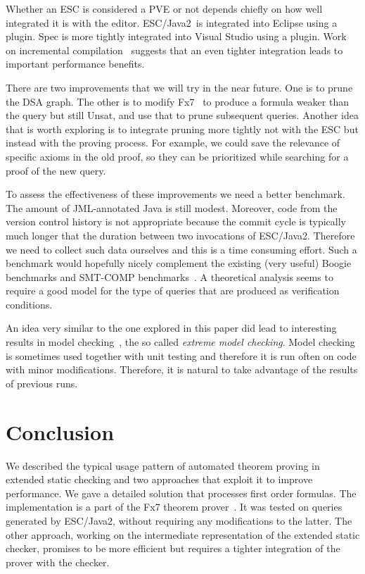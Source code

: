 \documentclass{llncs}
\def\unsat{{\sc Unsat}}
\def\escjava{\hskip 0pt\hbox{ESC/Java2}}
\begin{document}
Whether an ESC is considered a PVE or not depends chiefly
on how well integrated it is with the editor. \escjava\
is integrated into Eclipse using a plugin. Spec is
more tightly integrated into Visual Studio using a plugin.
Work on incremental compilation~\cite{schwartz1984icm}
suggests that an even tighter integration leads to important
performance benefits.

There are two improvements that we will try in the near 
future. One is to prune the DSA graph. The other is
to modify Fx7~\cite{fx7} to produce a formula weaker
than the query but still \unsat, and use that to prune
subsequent queries. Another idea that is worth exploring
is to integrate pruning more tightly not with the ESC but 
instead with the proving process. For example, we could
save the relevance of specific axioms in the old proof,
so they can be prioritized while searching for a proof 
of the new query.

To assess the effectiveness of these improvements we need
a better benchmark. The amount of JML-annotated
Java is still modest. Moreover, code from the version 
control history is not appropriate because the commit 
cycle is typically much longer that the duration between 
two invocations of \escjava. Therefore we need to collect 
such data ourselves and this is a time consuming effort. 
Such a benchmark would hopefully nicely complement the 
existing (very useful) Boogie benchmarks and SMT-COMP 
benchmarks~\cite{smtlib}. A theoretical analysis seems
to require a good model for the type of queries that
are produced as verification conditions.

An idea very similar to the one explored in this paper did
lead to interesting results in model checking~\cite{henzinger2004emc},
the so called \emph{extreme model checking}. Model checking
is sometimes used together with unit testing and therefore
it is run often on code with minor modifications.
Therefore, it is natural to take advantage of the results
of previous runs.

\section{Conclusion}

We described the typical usage pattern of automated theorem
proving in extended static checking and two approaches that
exploit it to improve performance. We gave a detailed solution 
that processes first order formulas. The implementation
is a part of the Fx7 theorem prover~\cite{fx7}. It was tested
on queries generated by \escjava, without requiring any
modifications to the latter. The other approach, working on
the intermediate representation of the extended static checker,
promises to be more efficient but requires a tighter integration
of the prover with the checker.
\end{document}
